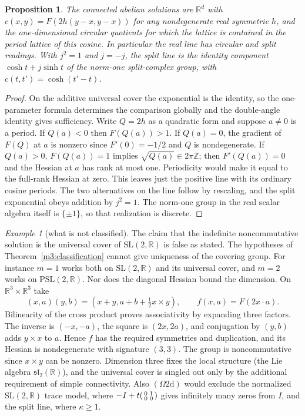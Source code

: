 \documentclass[11pt,reqno]{amsart}
\newtheorem{proposition}[theorem]{Proposition}
\theoremstyle{definition}
\theoremstyle{remark}
\newtheorem{example}[theorem]{Example}
\numberwithin{equation}{section}
\newcommand{\R}{\mathbb{R}}
\begin{document}
\begin{proposition}\label{m3:abelian}
The connected abelian solutions are \(\R^d\) with
\(c(x,y)=F(2h(y-x,y-x))\) for any nondegenerate real symmetric \(h\),
and the one-dimensional circular quotients for which the lattice is
contained in the period lattice of this cosine. In particular the real
line has circular and split readings. With \(j^2=1\) and \(\bar j=-j\),
the split line is the identity component
\(\cosh t+j\sinh t\) of the norm-one split-complex group, with
\(c(t,t')=\cosh(t'-t)\).
\end{proposition}
\begin{proof}
On the additive universal cover the exponential is the identity, so the
one-parameter formula determines the comparison globally and the
double-angle identity gives sufficiency. Write \(Q=2h\) as a quadratic
form and suppose \(a\ne0\) is a period. If \(Q(a)<0\) then \(F(Q(a))>1\).
If \(Q(a)=0\), the gradient of \(F(Q)\) at \(a\) is nonzero since
\(F'(0)=-1/2\) and \(Q\) is nondegenerate. If \(Q(a)>0\),
\(F(Q(a))=1\) implies \(\sqrt{Q(a)}\in2\pi\mathbb Z\); then
\(F'(Q(a))=0\) and the Hessian at \(a\) has rank at most one. Periodicity
would make it equal to the full-rank Hessian at zero. This leaves just
the positive line with its ordinary cosine periods. The two alternatives
on the line follow by rescaling, and the split exponential obeys addition
by \(j^2=1\). The norm-one group in the real scalar algebra itself is
\(\{\pm1\}\), so that realization is discrete.
\end{proof}

\begin{example}[what is not classified]\label{m3:obstructions}
The claim that the indefinite noncommutative solution is the universal cover of $\mathrm{SL}(2,\R)$ is false as stated.
The hypotheses of Theorem~\ref{m3:classification} cannot give uniqueness
of the covering group. For instance \(m=1\) works both on
\(\mathrm{SL}(2,\R)\) and its universal cover, and \(m=2\) works on
\(\mathrm{PSL}(2,\R)\). Nor does the diagonal Hessian bound the dimension.
On \(\R^3\times\R^3\) take
\[
 (x,a)(y,b)=(x+y,a+b+\tfrac12x\times y),\qquad
 f(x,a)=F(2x\cdot a).
\]
Bilinearity of the cross product proves associativity by expanding three
factors. The inverse is \((-x,-a)\), the square is \((2x,2a)\), and
conjugation by \((y,b)\) adds \(y\times x\) to \(a\). Hence \(f\) has the
required symmetries and duplication, and its Hessian is nondegenerate with
signature \((3,3)\). The group is noncommutative since \(x\times y\) can
be nonzero. Dimension three fixes the local structure (the Lie algebra $\mathfrak{sl}_2(\R)$), and the universal cover is singled out only
by the additional requirement of simple connectivity. Also \((\Omega2\mathrm d)\) would exclude the normalized
\(\mathrm{SL}(2,\R)\) trace model, where \(-I+t\begin{psmallmatrix}0&1\\0&0\end{psmallmatrix}\)
gives infinitely many zeros from \(I\), and the split line, where
\(\kappa\ge1\).
\end{example}
\end{document}
